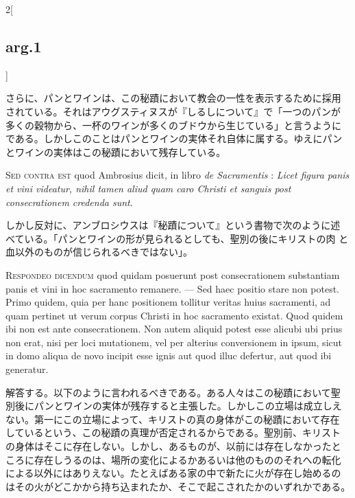 \documentclass[paper=a4paper,fontsize=10pt,jafontsize=9pt,titlepage]{jlreq}
\begin{document}
\begin{paracol}{2}[\subsection{arg.1}]
\switchcolumn

さらに、パンとワインは、この秘蹟において教会の一性を表示するために採用
されている。それはアウグスティヌスが『しるしについて』で「一つのパンが
多くの穀物から、一杯のワインが多くのブドウから生じている」と言うように
である。しかしこのことはパンとワインの実体それ自体に属する。ゆえにパン
とワインの実体はこの秘蹟において残存している。

\switchcolumn*[\subsection{s.c.}]

{\scshape Sed contra est} quod Ambrosius dicit, in libro {\itshape de
Sacramentis} : {\itshape Licet figura panis et vini videatur, nihil
tamen aliud quam caro Christi et sanguis post consecrationem credenda
sunt}.

\switchcolumn

しかし反対に、アンブロシウスは『秘蹟について』という書物で次のように述
べている。「パンとワインの形が見られるとしても、聖別の後にキリストの肉
と血以外のものが信じられるべきではない」。


{\scshape Respondeo dicendum} quod quidam posuerunt post
consecrationem substantiam panis et vini in hoc sacramento
remanere. --- Sed haec positio stare non potest. Primo quidem, quia
per hanc positionem tollitur veritas huius sacramenti, ad quam
pertinet ut verum corpus Christi in hoc sacramento existat. Quod
quidem ibi non est ante consecrationem. Non autem aliquid potest esse
alicubi ubi prius non erat, nisi per loci mutationem, vel per alterius
conversionem in ipsum, sicut in domo aliqua de novo incipit esse ignis
aut quod illuc defertur, aut quod ibi generatur.

\switchcolumn

解答する。以下のように言われるべきである。ある人々はこの秘蹟において聖
別後にパンとワインの実体が残存すると主張した。しかしこの立場は成立しえ
ない。第一にこの立場によって、キリストの真の身体がこの秘蹟において存在
しているという、この秘蹟の真理が否定されるからである。聖別前、キリスト
の身体はそこに存在しない。しかし、あるものが、以前には存在しなかったと
ころに存在しうるのは、場所の変化によるかあるいは他のもののそれへの転化
による以外にはありえない。たとえばある家の中で新たに火が存在し始めるの
はその火がどこかから持ち込まれたか、そこで起こされたかのいずれかである。


\end{paracol}
\end{document}
